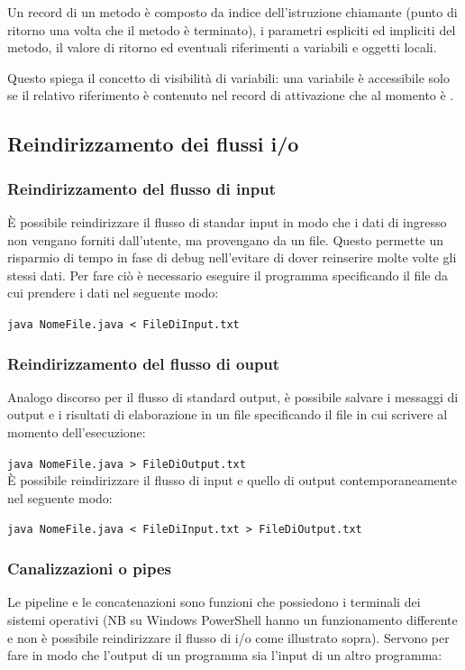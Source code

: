 \documentclass{article}
\begin{document}
Un record di un metodo è composto da indice dell'istruzione chiamante (punto di ritorno una volta che il metodo è terminato),
i parametri espliciti ed impliciti del metodo, il valore di ritorno ed eventuali riferimenti a variabili e oggetti locali.

Questo spiega il concetto di visibilità di variabili: una variabile è accessibile solo se il relativo riferimento è contenuto nel
record di attivazione che al momento è .

\subsection{Reindirizzamento dei flussi i/o}
\subsubsection*{Reindirizzamento del flusso di input}
È possibile reindirizzare il flusso di standar input in modo che i dati di ingresso non vengano forniti dall'utente, ma provengano
da un file. Questo permette un risparmio di tempo in fase di debug nell'evitare di dover reinserire molte volte gli stessi dati.
Per fare ciò è necessario eseguire il programma specificando il file da cui prendere i dati nel seguente modo:

\verb|java NomeFile.java < FileDiInput.txt|

\subsubsection*{Reindirizzamento del flusso di ouput}
Analogo discorso per il flusso di standard output, è possibile salvare i messaggi di output e i risultati di elaborazione in un file
specificando il file in cui scrivere al momento dell'esecuzione:

\verb|java NomeFile.java > FileDiOutput.txt|
\\
È possibile reindirizzare il flusso di input e quello di output contemporaneamente nel seguente modo:

\verb|java NomeFile.java < FileDiInput.txt > FileDiOutput.txt|


\subsubsection*{Canalizzazioni o pipes}
Le pipeline e le concatenazioni sono funzioni che possiedono i terminali dei sistemi operativi (NB su Windows PowerShell hanno un funzionamento
differente e non è possibile reindirizzare il flusso di i/o come illustrato sopra). Servono per fare in modo che l'output di un programma sia 
l'input di un altro programma:
\end{document}
